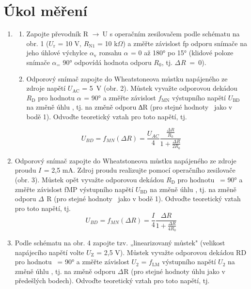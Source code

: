 \documentclass[a4paper,12pt]{article}   %
\newcommand{\tohm}{$\Omega$}
\newcommand{\var}[2]{$#1_\text{#2}$}
\newcommand{\rarrow}{$\rightarrow~$}
\begin{document}
\section{Úkol měření}
\label{chap:ukol}
\begin{enumerate}
    \item 
    \begin{enumerate}[label=\alph*)]
        \item  Zapojte převodník R \rarrow U s operačním zesilovačem podle schématu na obr. 1 (\var{U}{r} = 10 V, \var{R}{N1} = 10 k\tohm) a změřte závislost fp odporu snímače na jeho úhlové výchylce \var{\alpha} v rozsahu \var{\alpha}{} = 0 až 180° po 15° (klidové poloze snímače \var{\alpha} = 90° odpovídá hodnota odporu \var{R}{0}, tj. \var{\Delta}{}\var{R}{}~=~0).
    \item Odporový snímač zapojte do Wheatstoneova můstku napájeného ze zdroje napětí \var{U}{AC} = 5~V (obr. 2). Můstek vyvažte odporovou dekádou \var{R}{D} pro hodnotu \var{\alpha}{} = 90° a změřte závislost \var{f}{MN} výstupního napětí \var{U}{BD} na změně úhlu \textalpha, tj. na změně odporu ∆R (pro stejné hodnoty \textalpha\ jako v bodě 1). Odvoďte teoretický vztah pro toto napětí, tj.
    \end{enumerate}
    \begin{equation}
      U_{BD} = f_{MN}(\Delta R)=\frac{U_{AC}}{4}\frac{\frac{\Delta R}{R_0}}{1+\frac{\Delta R}{2R_0}}
    \end{equation}
    \item Odporový snímač zapojte do Wheatstoneova můstku napájeného ze zdroje proudu \var{I}{} = 2,5 mA. Zdroj proudu realizujte pomocí operačního zesilovače (obr. 3). Můstek opět vyvažte odporovou dekádou \var{R}{D} pro hodnotu \textalpha\ = 90° a změřte závislost fMP výstupního napětí \var{U}{BD} na změně úhlu \textalpha, tj. na změně odporu \var{\Delta}{} R (pro stejné hodnoty \textalpha\ jako v bodě 1). Odvoďte teoretický vztah pro toto napětí, tj.
    \begin{equation}
      U_{BD} = f_{MN}(\Delta R)=\frac{I}{4}\frac{\Delta R}{1+\frac{\Delta R}{4R_0}}
    \end{equation}
    \item Podle schématu na obr. 4 zapojte tzv. „linearizovaný můstek" (velikost napájecího napětí volte \var{U}{Z} = 2,5 V). Můstek vyvažte odporovou dekádou RD pro hodnotu \textalpha\ = 90° a změřte závislost \var{U}{2} = \var{f}{LM} výstupního napětí \var{U}{2} na změně úhlu \textalpha, tj. na změně odporu \var{\Delta}{}R (pro stejné hodnoty úhlu \textalpha jako v předešlých bodech). Odvoďte teoretický vztah pro toto napětí, tj.

\end{enumerate}
\end{document}
